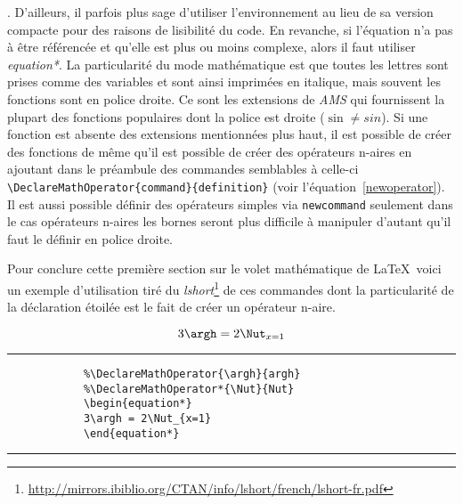 	. D'ailleurs, il parfois plus sage d'utiliser l'environnement au lieu de sa version compacte pour des raisons de lisibilité du code. En revanche, si l'équation n'a pas à être référencée et qu'elle est plus ou moins complexe, alors il faut utiliser \textit{equation*}. La particularité du mode mathématique est que toutes les lettres sont prises comme des variables et sont ainsi imprimées en italique, mais souvent les fonctions sont en police droite. Ce sont les extensions de \textit{AMS} qui fournissent la plupart des fonctions populaires dont la police est droite ($\sin \neq sin$). %
	Si une fonction est absente des extensions mentionnées plus haut, il est possible de créer des fonctions de même qu'il est possible de créer des opérateurs n-aires en ajoutant dans le préambule des commandes semblables à celle-ci
	\verb|\DeclareMathOperator{command}{definition}| (voir l'équation~\ref{newoperator}). Il est aussi possible définir des opérateurs simples via \verb|newcommand| seulement dans le cas opérateurs n-aires les bornes seront plus difficile à manipuler d'autant qu'il faut le définir en police droite.  
%
	\par Pour conclure cette première section sur le volet mathématique de \LaTeX~voici un exemple d'utilisation tiré du \textit{lshort}\footnote{\url{http://mirrors.ibiblio.org/CTAN/info/lshort/french/lshort-fr.pdf}} de ces commandes dont la particularité de la déclaration étoilée est le fait de créer un opérateur n-aire.
%	
	\begin{table}[H]
		\begin{equation}\label{newoperator}
		3\argh = 2\Nut_{x=1}
		\end{equation}
		\hrule
		\begin{verbatim}
			%\DeclareMathOperator{\argh}{argh}
			%\DeclareMathOperator*{\Nut}{Nut}
			\begin{equation*}
			3\argh = 2\Nut_{x=1}
			\end{equation*}
		\end{verbatim}
		\hrule
	\end{table}
%